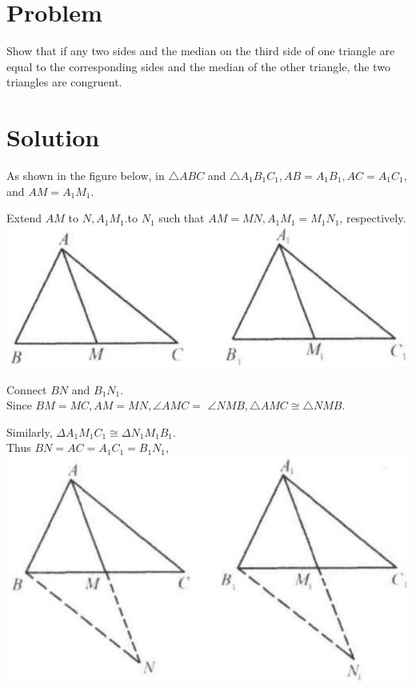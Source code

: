 \documentclass{article}
\begin{document}
\section*{Problem}
Show that if any two sides and the median on the third side of one triangle are equal to the corresponding sides and the median of the other triangle, the two triangles are congruent.

\section*{Solution}
As shown in the figure below, in \(\triangle A B C\) and \(\triangle A_{1} B_{1} C_{1}, A B=A_{1} B_{1}, A C=A_{1} C_{1}\), and \(A M=A_{1} M_{1}\).

Extend \(A M\) to \(N, A_{1} M_{1}\).to \(N_{1}\) such that \(A M=M N, A_{1} M_{1}=M_{1} N_{1}\), respectively.\\
\centering
\includegraphics[width=\textwidth]{images/031.jpg}

Connect \(B N\) and \(B_{1} N_{1}\).\\
Since \(B M=M C, A M=M N, \angle A M C=\) \(\angle N M B, \triangle A M C \cong \triangle N M B\).

Similarly, \(\Delta A_{1} M_{1} C_{1} \cong \Delta N_{1} M_{1} B_{1}\).\\
Thus \(B N=A C=A_{1} C_{1}=B_{1} N_{1}\),\\
\centering
\includegraphics[width=\textwidth]{images/031(1).jpg}
\end{document}
